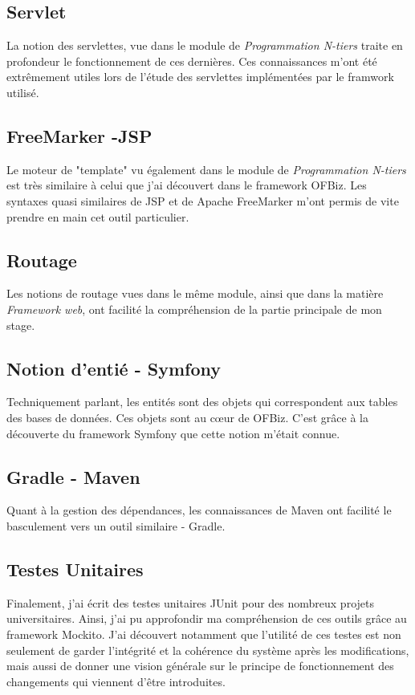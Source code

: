 \subsection{Servlet}
La notion des servlettes, vue dans le module de \emph{Programmation N-tiers} traite en profondeur le fonctionnement de ces dernières. Ces connaissances m'ont été extrêmement utiles lors de l'étude des servlettes implémentées par le framwork utilisé.   
\subsection{FreeMarker -JSP}
Le moteur de "template" vu également dans le module de \emph{Programmation N-tiers} est très similaire à celui que j'ai découvert dans le framework OFBiz. Les syntaxes quasi similaires de JSP et de Apache FreeMarker m'ont permis de vite prendre en main cet outil particulier. 
\subsection{Routage}
Les notions de routage vues dans le même module, ainsi que dans la matière \emph{Framework web}, ont facilité la compréhension de la partie principale de mon stage. 
\subsection{Notion d'entié - Symfony}
Techniquement parlant, les entités sont des objets qui correspondent aux tables des bases de données. Ces objets sont au cœur de OFBiz. C'est grâce à la découverte du framework Symfony que cette notion m'était connue. 
\subsection{Gradle - Maven}
Quant à la gestion des dépendances, les connaissances de Maven ont facilité le basculement vers un outil similaire - Gradle. 
\subsection{Testes Unitaires}
Finalement, j'ai écrit des testes unitaires JUnit pour des nombreux projets universitaires. Ainsi, j'ai pu approfondir ma compréhension de ces outils grâce au framework Mockito. J'ai découvert notamment que l'utilité de ces testes est non seulement de garder l'intégrité et la cohérence du système après les modifications, mais aussi de donner une vision générale sur le principe de fonctionnement des changements qui viennent d'être introduites. 









